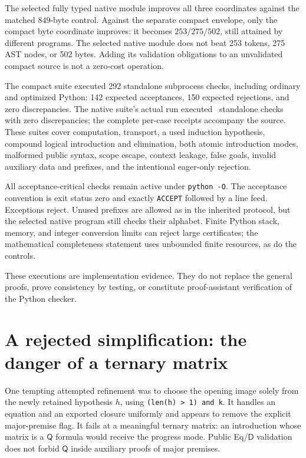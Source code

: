 \documentclass[11pt]{article}
\theoremstyle{definition}\newtheorem{definition}[theorem]{Definition}
\theoremstyle{remark}\newtheorem{remark}[theorem]{Remark}
\newcommand{\D}{\mathsf D}
\newcommand{\Q}{\mathsf Q}
\newcommand{\file}[1]{\nolinkurl{#1}}
\begin{document}
The selected fully typed native module improves all three coordinates
against the matched 849-byte control. Against the separate compact
envelope, only the compact byte coordinate improves: it becomes
\(253/275/502\), still attained by different programs. The selected
native module does not beat 253 tokens, 275 AST nodes, or 502 bytes.
Adding its validation obligations to an unvalidated compact source is
not a zero-cost operation.

The compact suite executed 292 standalone subprocess checks, including
ordinary and optimized Python: 142 expected acceptances, 150 expected
rejections, and zero discrepancies. The native suite's actual run
executed \NativeChecks\ standalone checks with zero discrepancies;
the complete per-case receipts accompany the source. These suites cover
computation, transport, a used induction hypothesis, compound logical
introduction and elimination, both atomic introduction modes, malformed
public syntax, scope escape, context leakage, false goals, invalid
auxiliary data and prefixes, and the intentional eager-only rejection.

All acceptance-critical checks remain active under \file{python -O}.
The acceptance convention is exit status zero and exactly
\file{ACCEPT} followed by a line feed. Exceptions reject. Unused prefixes
are allowed as in the inherited protocol, but the selected native program
still checks their alphabet. Finite Python stack, memory, and integer
conversion limits can reject large certificates; the mathematical
completeness statement uses unbounded finite resources, as do the controls.

These executions are implementation evidence. They do not replace the
general proofs, prove consistency by testing, or constitute proof-assistant
verification of the Python checker.

\section{A rejected simplification: the danger of a ternary matrix}
\label{main:rejected}

One tempting attempted refinement was to choose the opening image solely
from the newly retained hypothesis \(h\), using
\file{(len(h) > 1) and k}. It handles an equation and an exported closure
uniformly and appears to remove the explicit major-premise flag. It fails
at a meaningful ternary matrix: an introduction whose matrix is a
\(\Q\) formula would receive the progress mode. Public Eq/\(\D\) validation
does not forbid \(\Q\) inside auxiliary proofs of major premises.
\end{document}

